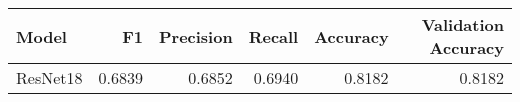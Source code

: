 \begin{tabular}{lrrrrr}
\toprule
Model & F1 & Precision & Recall & Accuracy & Validation Accuracy \\
\midrule
ResNet18 & 0.6839 & 0.6852 & 0.6940 & 0.8182 & 0.8182 \\
\bottomrule
\end{tabular}
